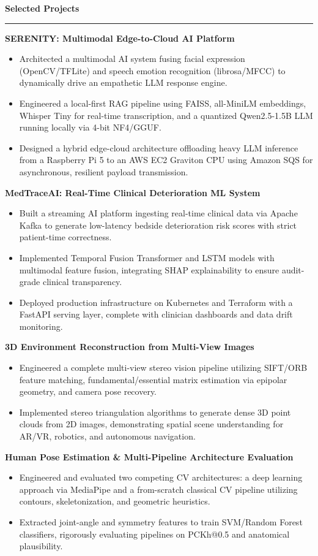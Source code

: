 \documentclass[10pt,a4paper]{article}
\newcommand{\sectiontitle}[1]{
  \vspace{5pt}\textbf{\large #1}\vspace{3pt}\\
  \hrule\vspace{5pt}
}
\begin{document}
\sectiontitle{Selected Projects}
\textbf{SERENITY: Multimodal Edge-to-Cloud AI Platform}
\begin{itemize}
  \item Architected a multimodal AI system fusing facial expression (OpenCV/TFLite) and speech emotion recognition (librosa/MFCC) to dynamically drive an empathetic LLM response engine.
  \item Engineered a local-first RAG pipeline using FAISS, all-MiniLM embeddings, Whisper Tiny for real-time transcription, and a quantized Qwen2.5-1.5B LLM running locally via 4-bit NF4/GGUF.
  \item Designed a hybrid edge-cloud architecture offloading heavy LLM inference from a Raspberry Pi 5 to an AWS EC2 Graviton CPU using Amazon SQS for asynchronous, resilient payload transmission.
\end{itemize}

\textbf{MedTraceAI: Real-Time Clinical Deterioration ML System}
\begin{itemize}
  \item Built a streaming AI platform ingesting real-time clinical data via Apache Kafka to generate low-latency bedside deterioration risk scores with strict patient-time correctness.
  \item Implemented Temporal Fusion Transformer and LSTM models with multimodal feature fusion, integrating SHAP explainability to ensure audit-grade clinical transparency.
  \item Deployed production infrastructure on Kubernetes and Terraform with a FastAPI serving layer, complete with clinician dashboards and data drift monitoring.
\end{itemize}

\textbf{3D Environment Reconstruction from Multi-View Images}
\begin{itemize}
  \item Engineered a complete multi-view stereo vision pipeline utilizing SIFT/ORB feature matching, fundamental/essential matrix estimation via epipolar geometry, and camera pose recovery.
  \item Implemented stereo triangulation algorithms to generate dense 3D point clouds from 2D images, demonstrating spatial scene understanding for AR/VR, robotics, and autonomous navigation.
\end{itemize}

\textbf{Human Pose Estimation \& Multi-Pipeline Architecture Evaluation}
\begin{itemize}
  \item Engineered and evaluated two competing CV architectures: a deep learning approach via MediaPipe and a from-scratch classical CV pipeline utilizing contours, skeletonization, and geometric heuristics.
  \item Extracted joint-angle and symmetry features to train SVM/Random Forest classifiers, rigorously evaluating pipelines on PCKh@0.5 and anatomical plausibility.
\end{itemize}
\end{document}
